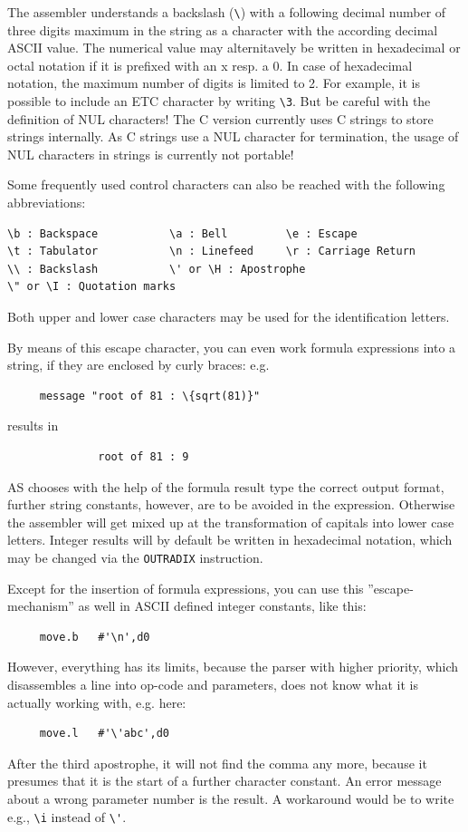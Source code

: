 \documentclass[12pt,twoside]{report}
\newcommand{\tty}[1]{{\tt #1}}
\newcommand{\asname}{{AS}}
\begin{document}
The assembler understands a backslash (\verb!\!) with a following decimal
number of three digits maximum in the string as a character with the
according decimal ASCII value.  The numerical value may alternitavely be
written in hexadecimal or octal notation if it is prefixed with an x resp.
a 0.  In case of hexadecimal notation, the maximum number of digits is
limited to 2.  For example, it is possible to include an ETC character by
writing {\tt\verb!\!3}.  But be careful with the definition of NUL
characters!  The C  version currently uses C strings
to store strings internally.  As C strings use a NUL character for
termination, the usage of NUL characters in strings is currently not
portable!

Some frequently used control characters can also be reached with the
following abbreviations:
\begin{verbatim}
\b : Backspace           \a : Bell         \e : Escape
\t : Tabulator           \n : Linefeed     \r : Carriage Return
\\ : Backslash           \' or \H : Apostrophe
\" or \I : Quotation marks
\end{verbatim}
Both upper and lower case characters may be used for the
identification letters.

By means of this escape character, you can even work formula
expressions into a string, if they are enclosed by curly braces: e.g.
\begin{verbatim}
     message "root of 81 : \{sqrt(81)}"
\end{verbatim}
results in
\begin{verbatim}
              root of 81 : 9
\end{verbatim}
\asname{} chooses with the help of the formula result type the correct
output format, further string constants, however, are to be avoided
in the expression.  Otherwise the assembler will get mixed up at the
transformation of capitals into lower case letters.  Integer results will
by default be written in hexadecimal notation, which may be changed via
the \tty{OUTRADIX} instruction.

Except for the insertion of formula expressions, you can use this
''escape-mechanism'' as well in ASCII defined integer constants,
like this:
\begin{verbatim}
     move.b   #'\n',d0
\end{verbatim}
However, everything has its limits, because the parser with higher
priority, which disassembles a line into op-code and parameters, does
not know what it is actually working with, e.g. here:
\begin{verbatim}
     move.l   #'\'abc',d0
\end{verbatim}
After the third apostrophe, it will not find the comma any more,
because it presumes that it is the start of a further character
constant. An error message about a wrong parameter number is the result.
A workaround would be to write e.g., \verb!\i! instead of \verb!\'!.
\end{document}

